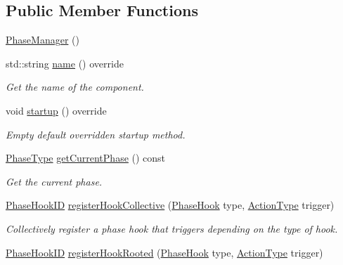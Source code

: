 \subsection*{Public Member Functions}
\begin{DoxyCompactItemize}
\item 
\hyperlink{structvt_1_1phase_1_1_phase_manager_a981990f9f44c00334f80be2e4eb604f5}{Phase\+Manager} ()
\item 
std\+::string \hyperlink{structvt_1_1phase_1_1_phase_manager_a159d95eca1eedeef33f245a3c232037d}{name} () override
\begin{DoxyCompactList}\small\item\em Get the name of the component. \end{DoxyCompactList}\item 
void \hyperlink{structvt_1_1phase_1_1_phase_manager_a541d1f6c7a350fad979911ac60f38025}{startup} () override
\begin{DoxyCompactList}\small\item\em Empty default overridden startup method. \end{DoxyCompactList}\item 
\hyperlink{namespacevt_a46ce6733d5cdbd735d561b7b4029f6d7}{Phase\+Type} \hyperlink{structvt_1_1phase_1_1_phase_manager_a217ff68fb553eedf12c9f4947a977ebd}{get\+Current\+Phase} () const
\begin{DoxyCompactList}\small\item\em Get the current phase. \end{DoxyCompactList}\item 
\hyperlink{structvt_1_1phase_1_1_phase_hook_i_d}{Phase\+Hook\+ID} \hyperlink{structvt_1_1phase_1_1_phase_manager_a31f6a6f91315fb68826ee073a7cb0a14}{register\+Hook\+Collective} (\hyperlink{namespacevt_1_1phase_aec9a63fdd99680d7a7fe99d321193811}{Phase\+Hook} type, \hyperlink{namespacevt_ae0a5a7b18cc99d7b732cb4d44f46b0f3}{Action\+Type} trigger)
\begin{DoxyCompactList}\small\item\em Collectively register a phase hook that triggers depending on the type of hook. \end{DoxyCompactList}\item 
\hyperlink{structvt_1_1phase_1_1_phase_hook_i_d}{Phase\+Hook\+ID} \hyperlink{structvt_1_1phase_1_1_phase_manager_a61a1797497a522f9352fe64abf3753be}{register\+Hook\+Rooted} (\hyperlink{namespacevt_1_1phase_aec9a63fdd99680d7a7fe99d321193811}{Phase\+Hook} type, \hyperlink{namespacevt_ae0a5a7b18cc99d7b732cb4d44f46b0f3}{Action\+Type} trigger)

\end{DoxyCompactItemize}
